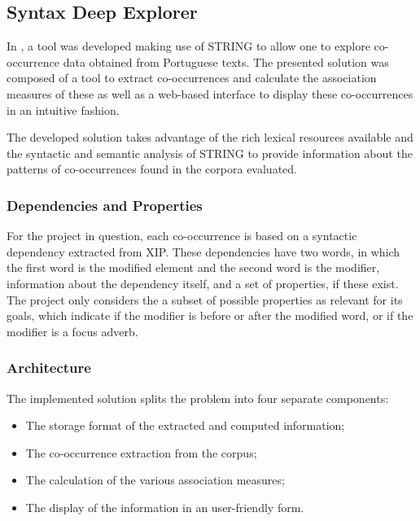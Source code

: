 \subsection{Syntax Deep Explorer}

In \citet{correia2015syntax}, a tool was developed making use of \ac{STRING} to
allow one to explore co-occurrence data obtained from Portuguese texts. The
presented solution was composed of a tool to extract co-occurrences and
calculate the association measures of these as well as a web-based interface to
display these co-occurrences in an intuitive fashion.

The developed solution takes advantage of the rich lexical resources available
and the syntactic and semantic analysis of \ac{STRING} to provide information
about the patterns of co-occurrences found in the corpora evaluated.

\subsubsection*{Dependencies and Properties}

For the project in question, each co-occurrence is based on a syntactic
dependency extracted from \ac{XIP}. These dependencies have two words, in which
the first word is the modified element and the second word is the modifier,
information about the dependency itself, and a set of properties, if these
exist. The project only considers the a subset of possible properties as 
relevant for its goals, which indicate if the modifier is before or after the 
modified word, or if the modifier is a focus adverb.


\subsubsection*{Architecture}

The implemented solution splits the problem into four separate components:

\begin{itemize}
 \item The storage format of the extracted and computed information;
 \item The co-occurrence extraction from the corpus;
 \item The calculation of the various association measures;
 \item The display of the information in an user-friendly form.
\end{itemize}

